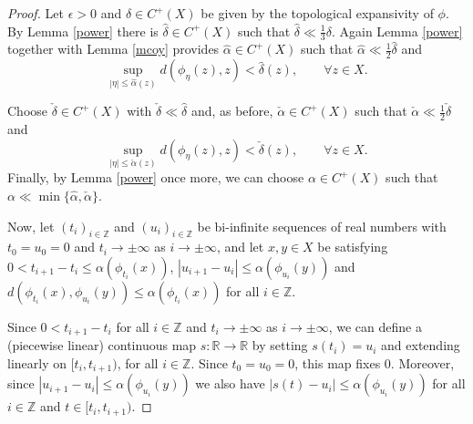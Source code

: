 \documentclass[10pt,a4paper]{amsart}
\begin{document}
\begin{proof}
Let $\epsilon>0$ and $\delta\in C^+(X)$ be given by the topological expansivity of $\phi$.
By  Lemma \ref{power} there is $\hat{\delta}\in C^+(X)$ such that
$
\hat{\delta}\ll \frac{1}3\delta.
$
Again Lemma \ref{power} together with Lemma \ref{mcoy} provides $\hat{\alpha}\in C^+(X)$ such that
$
\hat{\alpha}\ll \frac{1}2\hat{\delta}
$
and
\begin{equation}
\label{cha}
\sup_{|\eta|\leq \hat{\alpha}(z)}d(\phi_\eta(z),z)<\hat{\delta}(z),\quad\quad\forall z\in X.
\end{equation}

Choose $\check{\delta}\in C^+(X)$ with $\check{\delta}\ll \hat{\delta}$ and, as before, $\check{\alpha}\in C^+(X)$ such that
$
\check{\alpha}\ll \frac{1}2\check{\delta}
$
and
\begin{equation}
\label{chacho}
\sup_{|\eta|\leq \check{\alpha}(z)}d(\phi_\eta(z),z)<\check{\delta}(z),\quad\quad\forall z\in X.
\end{equation}
Finally, by Lemma \ref{power} once more, we can choose $\alpha\in C^+(X)$ such that $\alpha\ll\min\{\hat{\alpha},\check{\alpha}\}$.

Now, let $(t_i)_{i\in\mathbb{Z}}$ and $(u_i)_{i\in\mathbb{Z}}$ be bi-infinite sequences of real numbers with $t_0=u_0=0$ and $t_i\to\pm\infty$ as $i\to\pm\infty$, and let $x,y\in X$ be satisfying
$0<t_{i+1}-t_i\leq\alpha(\phi_{t_i}(x))$, $|u_{i+1}-u_i|\leq\alpha(\phi_{u_i}(y))$ and 
$d(\phi_{t_i}(x),\phi_{u_i}(y))\leq\alpha(\phi_{t_i}(x))$ for all $i\in\mathbb{Z}$.

Since $0<t_{i+1}-t_i$ for all $i\in\mathbb{Z}$ and $t_i\to\pm\infty$ as $i\to\pm\infty$, we can define a (piecewise linear) continuous map
$s:\mathbb{R}\to\mathbb{R}$ by setting $s(t_i)=u_i$ and extending linearly on $[t_i,t_{i+1})$,
for all $i\in\mathbb{Z}$.
Since $t_0=u_0=0$, this map fixes $0$.
Moreover, since $|u_{i+1}-u_i|\leq\alpha(\phi_{u_i}(y))$ we also have $|s(t)-u_i|\leq \alpha(\phi_{u_i}(y))$ for all $i\in\mathbb{Z}$ and $t\in [t_i,t_{i+1})$.


\end{proof}
\end{document}
